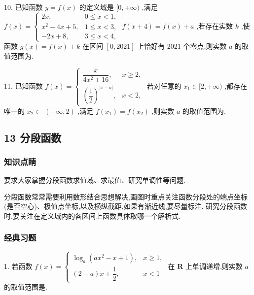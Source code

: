 10. 已知函数 $y = f\left( x\right)$ 的定义域是 $\lbrack 0, + \infty )$ ,满足 $f\left( x\right)  = \left\{  \begin{array}{ll} {2x}, & 0 \leq  x < 1, \\  {x}^{2} - {4x} + 5, & 1 \leq  x < 3, \\   - {2x} + 8, & 3 \leq  x < 4, \end{array}\right.$  $f\left( {x + 4}\right)  = f\left( x\right)  + a$ ,若存在实数 $k$ ,使函数 $g\left( x\right)  = f\left( x\right)  + k$ 在区间 $\left\lbrack  {0,{2021}}\right\rbrack$ 上恰好有 2021 个零点,则实数 $a$ 的取值范围为\blkda{}.

11. 已知函数 $f\left( x\right)  = \left\{  \begin{array}{ll} \dfrac{x}{4{x}^{2} + {16}}, & x \geq  2, \\  {\left( \dfrac{1}{2}\right) }^{\left| x - a\right| }, & x < 2, \end{array}\right.$ 若对任意的 ${x}_{1} \in  \lbrack 2, + \infty )$ ,都存在唯一的 ${x}_{2} \in$  $\left( {-\infty ,2}\right)$ ,满足 $f\left( {x}_{1}\right)  = f\left( {x}_{2}\right)$ ,则实数 $a$ 的取值范围为\blkda{}.

\subsection*{13 分段函数}

\subsubsection*{知识点睛}

要求大家掌握分段函数求值域、求最值、研究单调性等问题.

分段函数常常需要利用数形结合思想解决,画图时重点关注函数分段处的端点坐标(是否空心)、极值点坐标,以及横纵截距,如果有渐近线,要尽量标注. 研究分段函数时,要关注在定义域内的各区间上函数具体取哪一个解析式.

\subsubsection*{经典习题}

1. 若函数 $f\left( x\right)  = \left\{  \begin{array}{ll} {\log }_{a}\left( {a{x}^{2} - x + 1}\right) , & x \geq  1, \\  \left( {2 - a}\right) x + \dfrac{1}{2}, & x < 1 \end{array}\right.$ 在 $\mathbf{R}$ 上单调递增,则实数 $a$ 的取值范围是\blkda{}.

